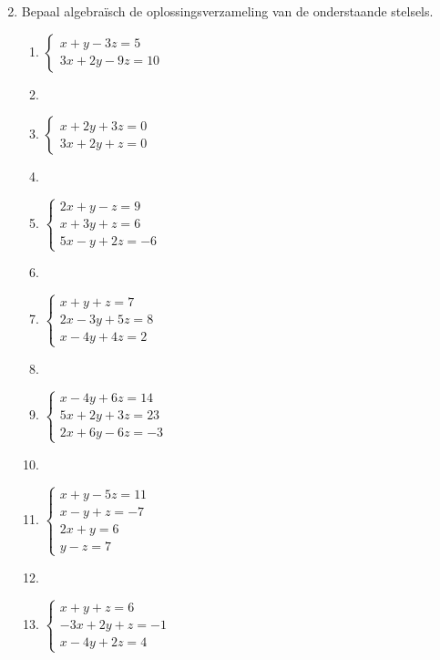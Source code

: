\begin{enumerate}
\begin{multicols}{2}
\begin{enumerate}
\end{enumerate}
\end{multicols}


\item Bepaal algebra\"isch de oplossingsverzameling van de onderstaande stelsels.
\begin{multicols}{2}
\begin{enumerate}
\item $\left\{\begin{array}{l}
x + y - 3z = 5 \\
3x + 2y - 9z = 10
\end{array} \right. $
\item []
\item $\left\{\begin{array}{l}
x + 2y + 3z = 0 \\
3x + 2y + z = 0
\end{array} \right. $
\item []
\item $\left\{\begin{array}{l}
2x + y - z = 9 \\
x + 3y + z = 6 \\
5x - y + 2z = -6
\end{array} \right. $
\item []
\item $\left\{\begin{array}{l}
x + y + z = 7 \\
2x - 3y + 5z = 8 \\
x - 4y + 4z = 2
\end{array} \right. $
\item []
\item $\left\{\begin{array}{l}
x - 4y + 6z = 14 \\
5x + 2y + 3z = 23 \\
2x + 6y - 6z = -3
\end{array} \right. $
\item []
\item $\left\{\begin{array}{l}
x + y - 5z = 11 \\
x - y + z = -7 \\
2x + y = 6 \\
y - z = 7
\end{array} \right. $

\item []
\item $\left\{\begin{array}{l}
x + y + z = 6 \\
-3x +2 y + z = -1 \\
x - 4y + 2z = 4
\end{array} \right. $


\end{enumerate}
\end{multicols}
\end{enumerate}
